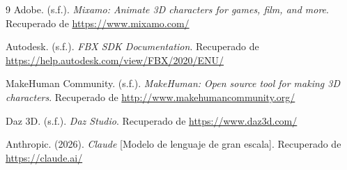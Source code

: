 \begin{thebibliography}{9}
Adobe. (s.f.). \textit{Mixamo: Animate 3D characters for games, film, and more}. Recuperado de \url{https://www.mixamo.com/}

Autodesk. (s.f.). \textit{FBX SDK Documentation}. Recuperado de \url{https://help.autodesk.com/view/FBX/2020/ENU/}

MakeHuman Community. (s.f.). \textit{MakeHuman: Open source tool for making 3D characters}. Recuperado de \url{http://www.makehumancommunity.org/}

Daz 3D. (s.f.). \textit{Daz Studio}. Recuperado de \url{https://www.daz3d.com/}

Anthropic. (2026). \textit{Claude} [Modelo de lenguaje de gran escala]. Recuperado de \url{https://claude.ai/}

\end{thebibliography}
